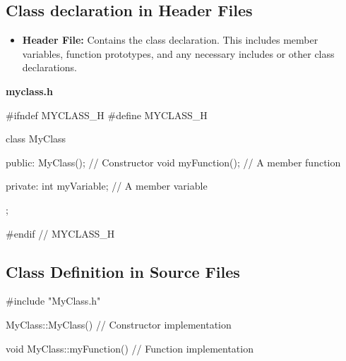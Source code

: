 \documentclass{report}
\begin{document}
    \subsection{Class declaration in Header Files}
    \bigbreak \noindent 
    \begin{itemize}
        \item \textbf{Header File:} Contains the class declaration. This includes member variables, function prototypes, and any necessary includes or other class declarations.
    \end{itemize}
    \bigbreak \noindent 
    \textbf{myclass.h}
    \bigbreak \noindent 
    \begin{cppcode}
#ifndef MYCLASS_H
#define MYCLASS_H

class MyClass {
public:
    MyClass(); // Constructor
    void myFunction(); // A member function

private:
    int myVariable; // A member variable
};

#endif // MYCLASS_H
    \end{cppcode}

    \bigbreak \noindent 
    \subsection{Class Definition in Source Files}
    \bigbreak \noindent 
    \begin{cppcode}
#include "MyClass.h"

MyClass::MyClass() {
    // Constructor implementation
}

void MyClass::myFunction() {
    // Function implementation
}
    \end{cppcode}





    



	

	




    
\end{document}
